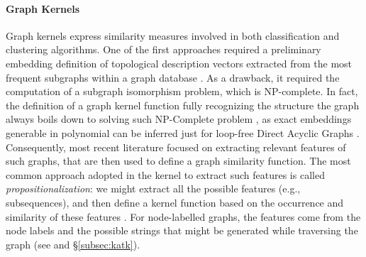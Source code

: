 \paragraph*{Graph Kernels} Graph kernels express similarity measures \cite{Samatova} involved in both classification \cite{TsudaS10} and clustering algorithms. One of the first approaches required a preliminary embedding definition of topological description vectors extracted from the most frequent subgraphs within a graph database \cite{Sidere}. As a drawback, it required the computation of a subgraph isomorphism problem, which is NP-complete. In fact, the definition of a graph kernel function fully recognizing the structure the graph always boils down to solving such NP-Complete problem \cite{GartnerFW03}, as exact embeddings generable in polynomial can be inferred just for loop-free Direct Acyclic Graphs \cite{BergamiBM20}. Consequently, most recent literature focused on extracting relevant features of such graphs, that are then used to define a graph similarity function. The most common approach adopted in the kernel to extract such features is called \textit{propositionalization}: we might extract all the possible features (e.g., subsequences), and then define a kernel function based on the occurrence and similarity of these features \cite{Gartner03}. For node-labelled graphs, the features come from the node labels and the possible strings that might be generated while traversing the graph (see \cite{Gartner03} and \S\ref{subsec:katk}). 